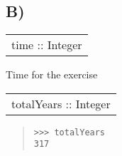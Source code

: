 \subsection{B)}
\begin{haddockdesc}
\item[\begin{tabular}{@{}l}
time :: Integer
\end{tabular}]
{\haddockbegindoc
Time for the exercise\par}
\end{haddockdesc}
\begin{haddockdesc}
\item[\begin{tabular}{@{}l}
totalYears :: Integer
\end{tabular}]
{\haddockbegindoc
\begin{quote}
{\haddockverb\begin{verbatim}
>>> totalYears
317

\end{verbatim}}
\end{quote}}
\end{haddockdesc}
